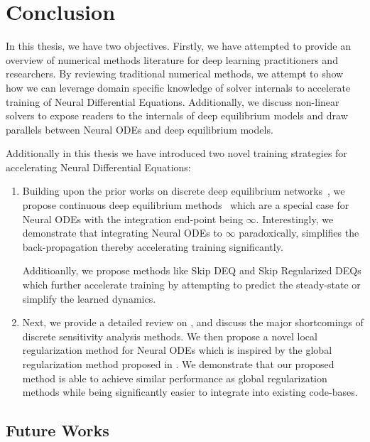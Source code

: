 \chapter{Conclusion}
\label{chapter:conclusion}

In this thesis, we have two objectives. Firstly, we have attempted to provide an overview of numerical methods literature for deep learning practitioners and researchers. By reviewing traditional numerical methods, we attempt to show how we can leverage domain specific knowledge of solver internals to accelerate training of Neural Differential Equations. Additionally, we discuss non-linear solvers to expose readers to the internals of deep equilibrium models and draw parallels between Neural ODEs and deep equilibrium models.

Additionally in this thesis we have introduced two novel training strategies for accelerating Neural Differential Equations:
%
\begin{enumerate}
    \item Building upon the prior works on discrete deep equilibrium networks~\citep{bai_deep_2019,bai_multiscale_2020}, we propose continuous deep equilibrium methods~\citep{pal2022mixing} which are a special case for Neural ODEs with the integration end-point being $\infty$. Interestingly, we demonstrate that integrating Neural ODEs to $\infty$ paradoxically, simplifies the back-propagation thereby accelerating training significantly.
    
        Additioanlly, we propose methods like Skip DEQ and Skip Regularized DEQs which further accelerate training by attempting to predict the steady-state or simplify the learned dynamics.

    \item Next, we provide a detailed review on \citet{pal2021opening}, and discuss the major shortcomings of discrete sensitivity analysis methods. We then propose a novel local regularization method for Neural ODEs which is inspired by the global regularization method proposed in \citet{pal2021opening}. We demonstrate that our proposed method is able to achieve similar performance as global regularization methods while being significantly easier to integrate into existing code-bases.
\end{enumerate}
%

\section*{Future Works}
\label{sec:future_works}

